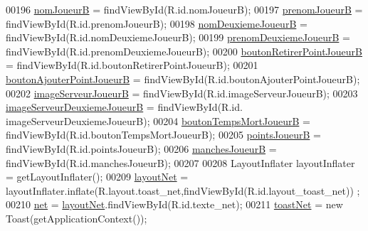 \begin{DoxyCode}
00196         \hyperlink{classcom_1_1example_1_1area_1_1_i_h_m_gestion_partie_a5aba0922e5b556ebc91d67793b149f52}{nomJoueurB} = findViewById(R.id.nomJoueurB);
00197         \hyperlink{classcom_1_1example_1_1area_1_1_i_h_m_gestion_partie_aa25eb218f30b28bb0b750c9fa0c1a9af}{prenomJoueurB} = findViewById(R.id.prenomJoueurB);
00198         \hyperlink{classcom_1_1example_1_1area_1_1_i_h_m_gestion_partie_a68aa62c03f3280a8f22d84e1701c1c3e}{nomDeuxiemeJoueurB} = findViewById(R.id.nomDeuxiemeJoueurB);
00199         \hyperlink{classcom_1_1example_1_1area_1_1_i_h_m_gestion_partie_aa5e959a5694b49790434a7d1006f57f3}{prenomDeuxiemeJoueurB} = findViewById(R.id.prenomDeuxiemeJoueurB);
00200         \hyperlink{classcom_1_1example_1_1area_1_1_i_h_m_gestion_partie_a198ecded9484cec42303eb70246bd590}{boutonRetirerPointJoueurB} = findViewById(R.id.boutonRetirerPointJoueurB);
00201         \hyperlink{classcom_1_1example_1_1area_1_1_i_h_m_gestion_partie_a8381630a907132144271c11cba2dce20}{boutonAjouterPointJoueurB} = findViewById(R.id.boutonAjouterPointJoueurB);
00202         \hyperlink{classcom_1_1example_1_1area_1_1_i_h_m_gestion_partie_a0b78d5ef6419187b3b24a2ab7db7dcea}{imageServeurJoueurB} = findViewById(R.id.imageServeurJoueurB);
00203         \hyperlink{classcom_1_1example_1_1area_1_1_i_h_m_gestion_partie_a543e5c8605174e111ada0719a0d86fe1}{imageServeurDeuxiemeJoueurB} = findViewById(R.id.
      imageServeurDeuxiemeJoueurB);
00204         \hyperlink{classcom_1_1example_1_1area_1_1_i_h_m_gestion_partie_a35331b85b4b0acc71a4ede7c78819bc0}{boutonTempsMortJoueurB} = findViewById(R.id.boutonTempsMortJoueurB);
00205         \hyperlink{classcom_1_1example_1_1area_1_1_i_h_m_gestion_partie_a88e51101924801095d21f65d16b337f3}{pointsJoueurB} = findViewById(R.id.pointsJoueurB);
00206         \hyperlink{classcom_1_1example_1_1area_1_1_i_h_m_gestion_partie_ae60c32d48a9fe634358fae66d760a573}{manchesJoueurB} = findViewById(R.id.manchesJoueurB);
00207 
00208         LayoutInflater layoutInflater = getLayoutInflater();
00209         \hyperlink{classcom_1_1example_1_1area_1_1_i_h_m_gestion_partie_ae9b9e3bd68c744139fe5b2300528beab}{layoutNet} = layoutInflater.inflate(R.layout.toast\_net,findViewById(R.id.layout\_toast\_net))
      ;
00210         \hyperlink{classcom_1_1example_1_1area_1_1_i_h_m_gestion_partie_ac097d7bed4ac981338629a28c0d70c1d}{net} = \hyperlink{classcom_1_1example_1_1area_1_1_i_h_m_gestion_partie_ae9b9e3bd68c744139fe5b2300528beab}{layoutNet}.findViewById(R.id.texte\_net);
00211         \hyperlink{classcom_1_1example_1_1area_1_1_i_h_m_gestion_partie_a490bd4b5241dfe6a5e709209a939fa2e}{toastNet} = \textcolor{keyword}{new} Toast(getApplicationContext());

\end{DoxyCode}

